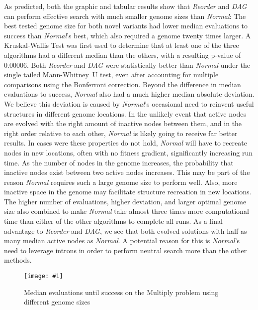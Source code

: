 \documentclass{sig-alternate}
\newcommand{\includegraphicsfit}[1]
{\texttt{[image: \#1]}}
\begin{document}
As predicted, both the graphic and tabular results show that \emph{Reorder} and
\emph{DAG} can perform effective search with much smaller genome sizes than \emph{Normal}:
The best tested genome size for both novel
variants had lower median evaluations to success than \emph{Normal}'s best, which
also required a genome twenty times larger.  A Kruskal-Wallis Test was first used
to determine that at least one of the three algorithms had a different median than the others,
with a resulting p-value of 0.00006.
Both \emph{Reorder} and \emph{DAG} were statistically better than \emph{Normal} under
the single tailed Mann-Whitney~U test, even after accounting for multiple comparisons
using the Bonferroni correction.
Beyond the difference in median evaluations to success, \emph{Normal} also had
a much higher median absolute deviation.
We believe this deviation is caused by \emph{Normal}'s occasional need to
reinvent useful structures in different genome locations.  In the unlikely event that
active nodes are evolved with the right amount of inactive nodes between them, and in the
right order relative to each other, \emph{Normal} is likely going to receive far better
results.  In cases were these properties do not hold, \emph{Normal} will
have to recreate nodes in new locations, often with no fitness gradient, significantly
increasing run time.  As the number of nodes in the genome increases, the probability
that inactive nodes exist between two active nodes increases.  This may be part of
the reason \emph{Normal} requires such a large genome size to perform well.
Also, more inactive space in the genome may facilitate structure recreation in new locations.
The higher number of evaluations, higher deviation, and larger optimal genome size
also combined to make \emph{Normal} take almost three times more computational time
than either of the other algorithms to complete all runs.
As a final advantage to \emph{Reorder} and \emph{DAG}, we see that both evolved
solutions with half as many median active nodes as \emph{Normal}.  A potential
reason for this is \emph{Normal}'s need to leverage introns in order to perform
neutral search more than the other methods.


\begin{figure}
  \centering
  \includegraphicsfit{multiply}
  \caption{Median evaluations until success on the Multiply problem using different genome sizes} 
  \label{fig-multiply}
\end{figure}
\end{document}
